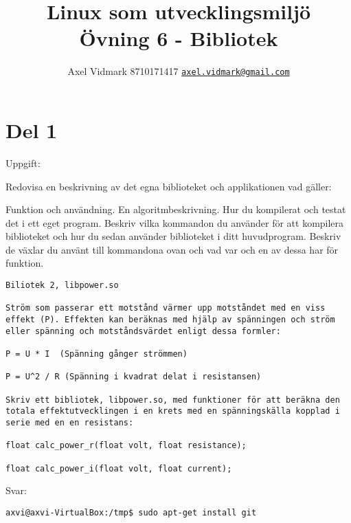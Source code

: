 \documentclass[10pt, a4paper]{article}
\author{Axel Vidmark 8710171417 \href{mailto:axel.vidmark@gmail.com}{\texttt{axel.vidmark@gmail.com}}}
\title{Linux som utvecklingsmiljö \\ Övning 6 - Bibliotek}
\begin{document}
\maketitle


\section*{Del 1}\label{sec:del1}

Uppgift:
\begin{enumerate}
Redovisa en beskrivning av det egna biblioteket och applikationen vad gäller:

Funktion och användning.
En algoritmbeskrivning.
Hur du kompilerat och testat det i ett eget program. Beskriv vilka kommandon du använder för att kompilera biblioteket och hur du sedan använder biblioteket i ditt huvudprogram.
Beskriv de växlar du använt till kommandona ovan och vad var och en av dessa har för funktion.
\end{enumerate}
\begin{verbatim}
Biliotek 2, libpower.so

Ström som passerar ett motstånd värmer upp motståndet med en viss effekt (P). Effekten kan beräknas med hjälp av spänningen och ström eller spänning och motståndsvärdet enligt dessa formler:

P = U * I  (Spänning gånger strömmen)

P = U^2 / R (Spänning i kvadrat delat i resistansen)

Skriv ett bibliotek, libpower.so, med funktioner för att beräkna den totala effektutvecklingen i en krets med en spänningskälla kopplad i serie med en en resistans:

float calc_power_r(float volt, float resistance);

float calc_power_i(float volt, float current);
\end{verbatim}

\vspace{10pt}
Svar:

\begin{verbatim}
axvi@axvi-VirtualBox:/tmp$ sudo apt-get install git


\end{verbatim}
\end{document}
